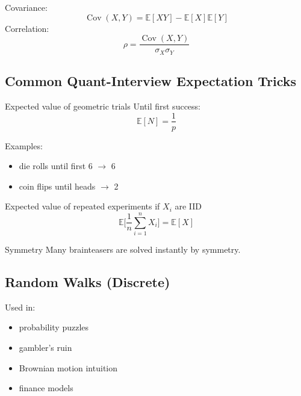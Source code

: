 \documentclass{report}
\begin{document}
Covariance:
\begin{equation}
    \operatorname{Cov}(X, Y) = \mathbb{E}[XY] - \mathbb{E}[X]\mathbb{E}[Y]
\end{equation}
Correlation:
\begin{equation}
    \rho = \frac{\operatorname{Cov}(X, Y)}{\sigma_X \sigma_Y}
\end{equation}

\subsection*{Common Quant-Interview Expectation Tricks}

Expected value of geometric trials
Until first success:
\begin{equation}
    \mathbb{E}[N]=\frac{1}{p}
\end{equation}

Examples:
\begin{itemize}
    \item die rolls until first 6 $\rightarrow$ 6
    \item coin flips until heads $\rightarrow$ 2
\end{itemize}

Expected value of repeated experiments
if $X_i$ are IID
\begin{equation}
    \mathbb{E}\bigg[\frac{1}{n}\sum_{i=1}^{n} X_i\bigg] = \mathbb{E}[X]
\end{equation}

Symmetry
Many brainteasers are solved instantly by symmetry.


\subsection*{Random Walks (Discrete)}

Used in:
\begin{itemize}
    \item probability puzzles
    \item gambler’s ruin
    \item Brownian motion intuition
    \item finance models
\end{itemize}
\end{document}
